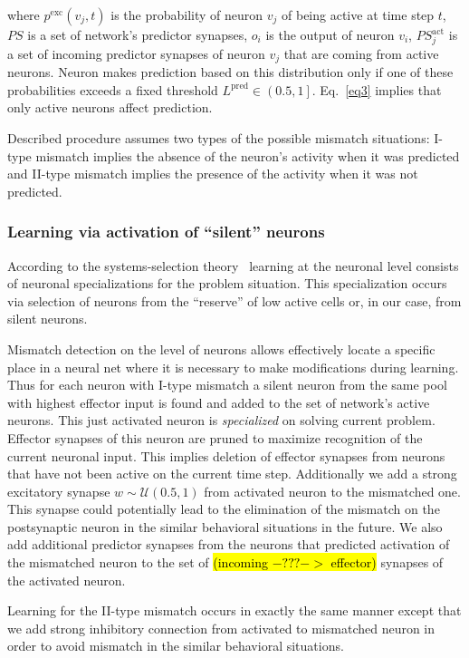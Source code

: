 \documentclass[letterpaper]{article}
\begin{document}
\noindent where $p^{\mathrm{exc}}\left(v_{j}, t\right)$ is the probability of neuron $v_{j}$ of being active at time step $t$, $PS$ is a set of network's predictor synapses, $o_{i}$ is the output of neuron $v_{i}$, $PS_{j}^{\mathrm{act}}$ is a set of incoming predictor synapses of neuron $v_{j}$ that are coming from active neurons. Neuron makes prediction based on this distribution only if one of these probabilities exceeds a fixed threshold $L^{\mathrm{pred}}\in\left(0.5,1\right]$.  Eq.~\ref{eq3} implies that only active neurons affect prediction. 

Described procedure assumes two types of the possible mismatch situations: I-type mismatch implies the absence of the neuron's activity when it was predicted and II-type mismatch implies the presence of the activity when it was not predicted. 

\subsubsection{Learning via activation of ``silent'' neurons} According to the systems-selection theory~\citep{Shvyrkov1986} learning at the neuronal level consists of neuronal specializations for the problem situation. This  specialization occurs via selection of neurons from the ``reserve'' of low active cells or, in our case, from silent neurons. 

Mismatch detection on the level of neurons allows effectively locate a specific place in a neural net where it is necessary to make modifications during learning. Thus for each neuron with I-type mismatch a silent neuron from the same pool with highest effector input is found and added to the set of network's active neurons. This just activated neuron is \textit{specialized} on solving current problem. Effector synapses of this neuron are pruned to maximize recognition of the current neuronal input. This implies deletion of effector synapses from neurons that have not been active on the current time step. Additionally we add a strong excitatory synapse $w\sim\mathcal{U}\left(0.5,1\right)$ from activated neuron to the mismatched one. This synapse could potentially lead to the elimination of the mismatch on the postsynaptic neuron in the similar behavioral situations in the future. We also add additional predictor synapses from the neurons that predicted activation of the mismatched neuron to the set of \hl{(incoming $-???->$ effector)} synapses of the activated neuron. 

Learning for the II-type mismatch occurs in exactly the same manner except that we add strong inhibitory connection from activated to mismatched neuron in order to avoid mismatch in the similar behavioral situations.   
\end{document}
